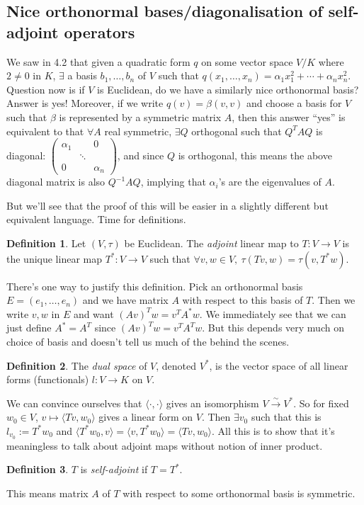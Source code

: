 \documentclass[a4paper]{article}
\theoremstyle{definition}
\newtheorem{defn}{Definition}[subsection]
\begin{document}
\subsection{Nice orthonormal bases/diagonalisation of self-adjoint operators}
We saw in 4.2 that given a quadratic form $q$ on some vector space $V/K$ where $2\neq 0$ in $K$, $\exists$ a basis $b_1,\ldots,b_n$ of $V$ such that $q(x_1,\ldots,x_n) = \alpha_1 x_1^2 +\cdots +\alpha_n x_n^2$. Question now is if $V$ is Euclidean, do we have a similarly nice orthonormal basis? Answer is yes! Moreover, if we write $q(v)=\beta (v,v)$ and choose a basis for $V$ such that $\beta$ is represented by a symmetric matrix $A$, then this answer ``yes'' is equivalent to that $\forall A$ real symmetric, $\exists Q$ orthogonal such that $Q^TAQ$ is diagonal: $\begin{pmatrix}
\alpha_1 & & 0\\ & \ddots & \\ 0 & & \alpha_n
\end{pmatrix}$, and since $Q$ is orthogonal, this means the above diagonal matrix is also $Q^{-1}AQ$, implying that $\alpha_i$'s are the eigenvalues of $A$.

But we'll see that the proof of this will be easier in a slightly different but equivalent language. Time for definitions.
\begin{defn}
Let $(V,\tau)$ be Euclidean. The \textit{adjoint} linear map to $T:V\rightarrow V$ is the unique linear map $T^\ast : V\rightarrow V$ such that $\forall v,w\in V,\ \tau (Tv,w) = \tau(v,T^\ast w)$.
\end{defn}
There's one way to justify this definition. Pick an orthonormal basis $E=(e_1,\ldots,e_n)$ and we have matrix $A$ with respect to this basis of $T$. Then we write $v,w$ in $E$ and want $(Av)^Tw = v^TA^\ast w$. We immediately see that we can just define $A^\ast=A^T$ since $(Av)^Tw = v^TA^Tw$. But this depends very much on choice of basis and doesn't tell us much of the behind the scenes.
\begin{defn}
The \textit{dual space} of $V$, denoted $V^\ast$, is the vector space of all linear forms (functionals) $l:V\rightarrow K$ on $V$.
\end{defn}
We can convince ourselves that $\langle \cdot,\cdot \rangle$ gives an isomorphism $V\xrightarrow{\sim}V^\ast$. So for fixed $w_0\in V$, $v\mapsto \langle Tv,w_0\rangle$ gives a linear form on $V$. Then $\exists v_0$ such that this is $l_{v_0}:=T^\ast w_0$ and $\langle T^\ast w_0,v\rangle = \langle v,T^\ast w_0 \rangle = \langle Tv,w_0 \rangle$. All this is to show that it's meaningless to talk about adjoint maps without notion of inner product.
\begin{defn}
$T$ is \textit{self-adjoint} if $T=T^\ast$.
\end{defn}
This means matrix $A$ of $T$ with respect to some orthonormal basis is symmetric.
\end{document}
